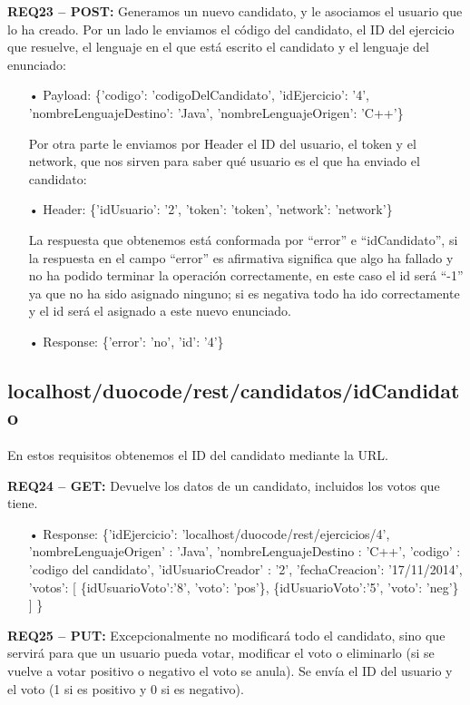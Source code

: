 \textbf{REQ23 – POST:} Generamos un nuevo candidato, y le asociamos el usuario que lo ha creado. Por un lado le enviamos el código del candidato, el ID del ejercicio que resuelve, el lenguaje en el que está escrito el candidato y el lenguaje del enunciado:
\begin{itemize}
\item[•]
Payload: 
\{'codigo': 'codigoDelCandidato', 'idEjercicio': '4', 'nombreLenguajeDestino': 'Java', 'nombreLenguajeOrigen': 'C++'\}
\vspace{1em}

Por otra parte le enviamos por Header el ID del usuario, el token y el network, que nos sirven para saber qué usuario es el que ha enviado el candidato:
\item[•]
Header: 
\{'idUsuario': '2', 'token': 'token', 'network': 'network'\}
\vspace{1em}

La respuesta que obtenemos está conformada por “error” e “idCandidato”, si la respuesta en el campo “error” es afirmativa significa que algo ha fallado y no ha podido terminar la operación correctamente, en este caso el id será “-1” ya que no ha sido asignado ninguno; si es negativa todo ha ido correctamente y el id será el asignado a este nuevo enunciado. 
\item[•]
Response: 
\{'error': 'no', 'id': '4'\}
\end{itemize}

\subsection{localhost/duocode/rest/candidatos/idCandidato}
En estos requisitos obtenemos el ID del candidato mediante la URL.
\vspace{1em}

\textbf{REQ24 – GET:} Devuelve los datos de un candidato, incluidos los votos que tiene.

\begin{itemize}
\item[•]
Response: 
\{'idEjercicio': 'localhost/duocode/rest/ejercicios/4', 'nombreLenguajeOrigen' : 'Java', 'nombreLenguajeDestino : 'C++', 'codigo' : 'codigo del candidato', 'idUsuarioCreador' : '2', 'fechaCreacion': '17/11/2014', 'votos': [ \{idUsuarioVoto':'8', 'voto': 'pos'\}, \{idUsuarioVoto':'5', 'voto': 'neg'\} ] \}
\end{itemize}

\textbf{REQ25 – PUT:} Excepcionalmente no modificará todo el candidato, sino que servirá para que un usuario pueda votar, modificar el voto o eliminarlo (si se vuelve a votar positivo o negativo el voto se anula). Se envía el ID del usuario y el voto (1 si es positivo y 0 si es negativo).


